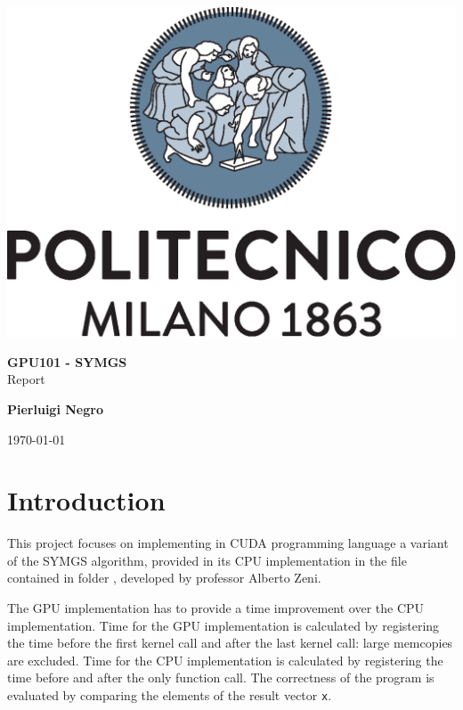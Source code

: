 \documentclass[a4paper,oneside]{report}
\newcommand\nbvspace[1][3]{\vspace*{\stretch{#1}}}
\begin{document}
    \begin{titlepage}

        \begin{center}

            \nbvspace[1]

            \includegraphics[width=0.3\columnwidth]{./images/polimi}

            \nbvspace[2]

            {\huge \textbf{\textsc{GPU101 - SYMGS}}} \\
            [1.5em]
            {\Large Report}

            \nbvspace[8]

            \Large \textbf{Pierluigi Negro}

            \nbvspace[2]

            \today \\ [0.5em]

            \nbvspace[1]


        \end{center}

    \end{titlepage}

    \pagebreak

    \chapter*{Introduction}
    
    \large 
    This project focuses on implementing in CUDA programming language a variant of the SYMGS algorithm, provided in its CPU implementation in the file  contained in folder , developed by professor Alberto Zeni. 
    
    The GPU implementation has to provide a time improvement over the CPU implementation. Time for the GPU implementation is calculated by registering the time before the first kernel call and after the last kernel call: large memcopies are excluded. Time for the CPU implementation is calculated by registering the time before and after the only function call. The correctness of the program is evaluated by comparing the elements of the result vector \verb|x|.
\end{document}
